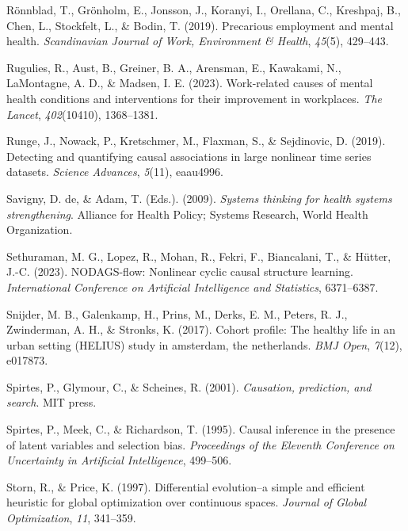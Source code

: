 \documentclass[
]{article}
\newlength{\cslhangindent}
\newenvironment{CSLReferences}[2] %
 {\begin{list}{}{%
  \setlength{\itemindent}{0pt}
  \setlength{\leftmargin}{0pt}
  \setlength{\parsep}{0pt}
  \ifodd #1
   \setlength{\leftmargin}{\cslhangindent}
   \setlength{\itemindent}{-1\cslhangindent}
  \fi
  \setlength{\itemsep}{#2\baselineskip}}}
 {\end{list}}
\begin{document}
\begin{CSLReferences}{1}{0}
Rönnblad, T., Grönholm, E., Jonsson, J., Koranyi, I., Orellana, C.,
Kreshpaj, B., Chen, L., Stockfelt, L., \& Bodin, T. (2019). Precarious
employment and mental health. \emph{Scandinavian Journal of Work,
Environment \& Health}, \emph{45}(5), 429--443.

Rugulies, R., Aust, B., Greiner, B. A., Arensman, E., Kawakami, N.,
LaMontagne, A. D., \& Madsen, I. E. (2023). Work-related causes of
mental health conditions and interventions for their improvement in
workplaces. \emph{The Lancet}, \emph{402}(10410), 1368--1381.

Runge, J., Nowack, P., Kretschmer, M., Flaxman, S., \& Sejdinovic, D.
(2019). Detecting and quantifying causal associations in large nonlinear
time series datasets. \emph{Science Advances}, \emph{5}(11), eaau4996.

Savigny, D. de, \& Adam, T. (Eds.). (2009). \emph{Systems thinking for
health systems strengthening}. Alliance for Health Policy; Systems
Research, World Health Organization.

Sethuraman, M. G., Lopez, R., Mohan, R., Fekri, F., Biancalani, T., \&
Hütter, J.-C. (2023). NODAGS-flow: Nonlinear cyclic causal structure
learning. \emph{International Conference on Artificial Intelligence and
Statistics}, 6371--6387.

Snijder, M. B., Galenkamp, H., Prins, M., Derks, E. M., Peters, R. J.,
Zwinderman, A. H., \& Stronks, K. (2017). Cohort profile: The healthy
life in an urban setting (HELIUS) study in amsterdam, the netherlands.
\emph{BMJ Open}, \emph{7}(12), e017873.

Spirtes, P., Glymour, C., \& Scheines, R. (2001). \emph{Causation,
prediction, and search}. MIT press.

Spirtes, P., Meek, C., \& Richardson, T. (1995). Causal inference in the
presence of latent variables and selection bias. \emph{Proceedings of
the {Eleventh} Conference on {Uncertainty} in Artificial Intelligence},
499--506.

Storn, R., \& Price, K. (1997). Differential evolution--a simple and
efficient heuristic for global optimization over continuous spaces.
\emph{Journal of Global Optimization}, \emph{11}, 341--359.


\end{CSLReferences}
\end{document}
